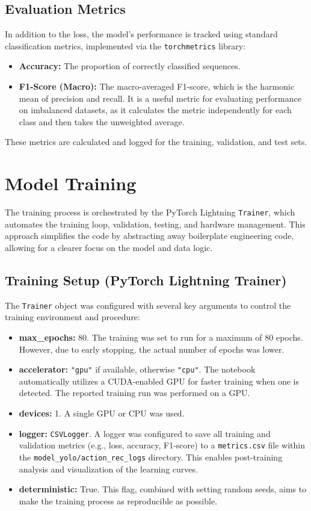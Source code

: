 \documentclass[11pt, a4paper]{article}
\begin{document}
\subsection{Evaluation Metrics}
In addition to the loss, the model's performance is tracked using standard classification metrics, implemented via the \texttt{torchmetrics} library:
\begin{itemize}
    \item \textbf{Accuracy:} The proportion of correctly classified sequences.
    \item \textbf{F1-Score (Macro):} The macro-averaged F1-score, which is the harmonic mean of precision and recall. It is a useful metric for evaluating performance on imbalanced datasets, as it calculates the metric independently for each class and then takes the unweighted average.
\end{itemize}
These metrics are calculated and logged for the training, validation, and test sets.



\section{Model Training}
The training process is orchestrated by the PyTorch Lightning \texttt{Trainer}, which automates the training loop, validation, testing, and hardware management. This approach simplifies the code by abstracting away boilerplate engineering code, allowing for a clearer focus on the model and data logic.

\subsection{Training Setup (PyTorch Lightning Trainer)}
The \texttt{Trainer} object was configured with several key arguments to control the training environment and procedure:
\begin{itemize}
    \item \textbf{max\_epochs:} 80. The training was set to run for a maximum of 80 epochs. However, due to early stopping, the actual number of epochs was lower.
    \item \textbf{accelerator:} \texttt{"gpu"} if available, otherwise \texttt{"cpu"}. The notebook automatically utilizes a CUDA-enabled GPU for faster training when one is detected. The reported training run was performed on a GPU.
    \item \textbf{devices:} 1. A single GPU or CPU was used.
    \item \textbf{logger:} \texttt{CSVLogger}. A logger was configured to save all training and validation metrics (e.g., loss, accuracy, F1-score) to a \texttt{metrics.csv} file within the \texttt{model\_yolo/action\_rec\_logs} directory. This enables post-training analysis and visualization of the learning curves.
    \item \textbf{deterministic:} True. This flag, combined with setting random seeds, aims to make the training process as reproducible as possible.
\end{itemize}
\end{document}
